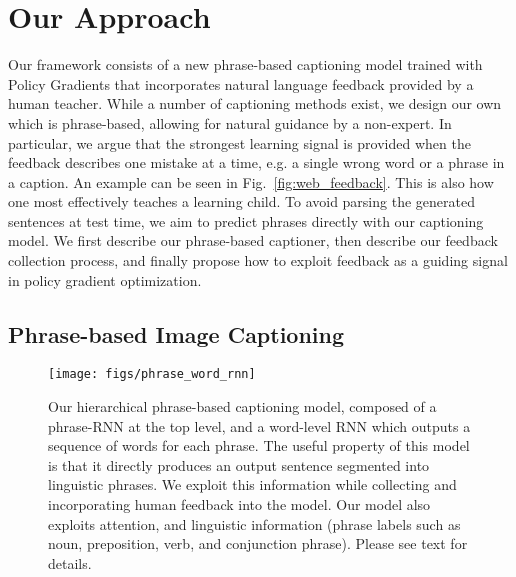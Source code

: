 \vspace{-3mm}
\section{Our Approach}
\label{sec:approach}
\vspace{-1mm}

Our framework consists of a new phrase-based captioning model trained with Policy Gradients that incorporates natural language feedback provided by a human teacher. 
While a number of captioning methods exist, we design our own which is phrase-based, allowing for natural guidance by a non-expert. 
In particular, we argue that the strongest learning signal is provided when the feedback describes one mistake at a time, e.g. a single wrong word or a phrase in a caption. An example can be seen in Fig.~\ref{fig:web_feedback}. This is also how one most effectively teaches a learning child. To avoid parsing the generated sentences at test time, we aim to predict phrases directly with our captioning model. We first describe our phrase-based captioner, then describe our feedback collection process, and finally propose how to exploit feedback as a guiding signal in policy gradient optimization. 

\vspace{-2mm}
\subsection{Phrase-based Image Captioning}
\vspace{-1mm}

\begin{figure}[t!]
\vspace{-2mm}
\begin{minipage}{0.54\linewidth}
  \texttt{[image: figs/phrase\_word\_rnn]}
  \end{minipage}
  \hspace{2mm}
  \begin{minipage}{0.42\linewidth}
  \caption{\small Our hierarchical phrase-based captioning model, composed of a phrase-RNN at the top level, and a word-level RNN which outputs a sequence of words for each phrase. The useful property of this model is that it directly produces an output sentence segmented into linguistic phrases. We exploit this information while collecting and incorporating human feedback into the model. Our model also exploits attention, and linguistic information (phrase labels such as noun, preposition, verb, and conjunction phrase). Please see text for details. }
  \label{fig:phrasemodel}
  \end{minipage}
  \vspace{-2mm}
\end{figure}

